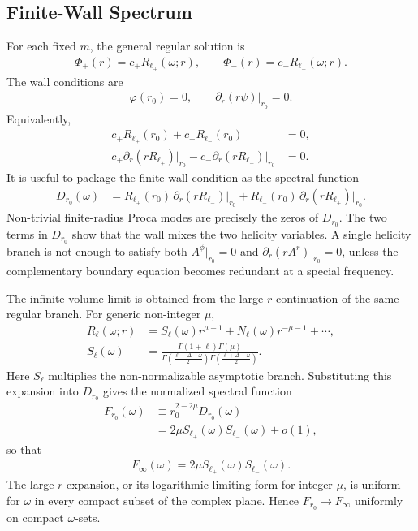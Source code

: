 \documentclass[11pt]{article}
\newcommand{\pd}{\partial}
\begin{document}
\subsection{Finite-Wall Spectrum}

For each fixed \(m\), the general regular solution is
\begin{align}
\Phi_+(r)=c_+R_{\ell_+}(\omega;r),\qquad
\Phi_-(r)=c_-R_{\ell_-}(\omega;r).
\end{align}
The wall conditions are
\begin{align}
\varphi(r_0)=0,\qquad \pd_r(r\psi)\big|_{r_0}=0 .
\end{align}
Equivalently,
\begin{align}
c_+R_{\ell_+}(r_0)+c_-R_{\ell_-}(r_0)&=0,\\
c_+\pd_r\!\left(rR_{\ell_+}\right)\big|_{r_0}
-c_-\pd_r\!\left(rR_{\ell_-}\right)\big|_{r_0}&=0 .
\end{align}
It is useful to package the finite-wall condition as the spectral function
\begin{align}
D_{r_0}(\omega)
&=R_{\ell_+}(r_0)\,\pd_r\!\left(rR_{\ell_-}\right)\big|_{r_0}
+R_{\ell_-}(r_0)\,\pd_r\!\left(rR_{\ell_+}\right)\big|_{r_0}.
\end{align}
Non-trivial finite-radius Proca modes are precisely the zeros of
\(D_{r_0}\).  The two terms in \(D_{r_0}\) show that the wall mixes the two
helicity variables.  A single helicity branch is not enough to satisfy both
\(A^\phi|_{r_0}=0\) and \(\pd_r(rA^r)|_{r_0}=0\), unless the complementary
boundary equation becomes redundant at a special frequency.

The infinite-volume limit is obtained from the large-\(r\) continuation of the
same regular branch.  For generic non-integer \(\mu\),
\begin{align}
R_\ell(\omega;r)
&=S_\ell(\omega)r^{\mu-1}+N_\ell(\omega)r^{-\mu-1}+\cdots,\\
S_\ell(\omega)
&=\frac{\Gamma(1+\ell)\Gamma(\mu)}
{\Gamma\!\left(\frac{\ell+\Delta-\omega}{2}\right)
\Gamma\!\left(\frac{\ell+\Delta+\omega}{2}\right)} .
\end{align}
Here \(S_\ell\) multiplies the non-normalizable asymptotic branch.  Substituting
this expansion into \(D_{r_0}\) gives the normalized spectral function
\begin{align}
F_{r_0}(\omega)
&\equiv r_0^{2-2\mu}D_{r_0}(\omega)\\
&=2\mu S_{\ell_+}(\omega)S_{\ell_-}(\omega)+o(1),
\end{align}
so that
\begin{align}
F_\infty(\omega)=2\mu S_{\ell_+}(\omega)S_{\ell_-}(\omega).
\end{align}
The large-\(r\) expansion, or its logarithmic limiting form for integer
\(\mu\), is uniform for \(\omega\) in every compact subset of the complex
plane.  Hence \(F_{r_0}\to F_\infty\) uniformly on compact \(\omega\)-sets.
\end{document}
